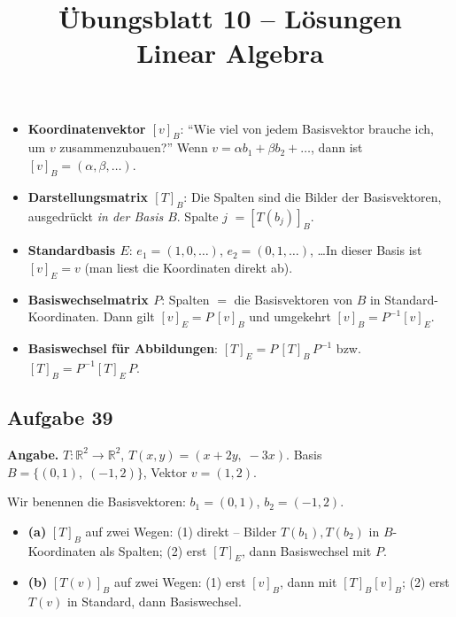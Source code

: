 \documentclass[a4paper,12pt]{article}
\title{\"Ubungsblatt 10 -- L\"osungen \\ \large Linear Algebra}
\author{}
\date{}
\begin{document}
\maketitle

\begin{begriffe}
\begin{itemize}[leftmargin=*, nosep]
    \item \textbf{Koordinatenvektor $[v]_B$}: ``Wie viel von jedem Basisvektor brauche ich, um $v$ zusammenzubauen?'' Wenn $v = \alpha b_1 + \beta b_2 + \dots$, dann ist $[v]_B = (\alpha, \beta, \dots)$.
    \item \textbf{Darstellungsmatrix $[T]_B$}: Die Spalten sind die Bilder der Basisvektoren, ausgedr\"uckt \emph{in der Basis $B$}. Spalte $j$ $= [T(b_j)]_B$.
    \item \textbf{Standardbasis $E$}: $e_1 = (1,0,\dots)$, $e_2 = (0,1,\dots)$, \dots In dieser Basis ist $[v]_E = v$ (man liest die Koordinaten direkt ab).
    \item \textbf{Basiswechselmatrix $P$}: Spalten $=$ die Basisvektoren von $B$ in Standard-Koordinaten. Dann gilt $[v]_E = P\,[v]_B$ und umgekehrt $[v]_B = P^{-1} [v]_E$.
    \item \textbf{Basiswechsel f\"ur Abbildungen}: $[T]_E = P\,[T]_B\,P^{-1}$ \quad bzw. \quad $[T]_B = P^{-1} [T]_E\, P$.
\end{itemize}
\end{begriffe}

\subsection*{Aufgabe 39}

\textbf{Angabe.} $T \colon \mathbb{R}^2 \to \mathbb{R}^2$, $T(x, y) = (x + 2y,\; -3x)$. Basis $B = \{(0,1),\; (-1,2)\}$, Vektor $v = (1, 2)$.

Wir benennen die Basisvektoren: $b_1 = (0, 1)$, $b_2 = (-1, 2)$.

\begin{wastun}
\begin{itemize}[leftmargin=*, nosep]
    \item \textbf{(a)} $[T]_B$ auf zwei Wegen: (1) direkt -- Bilder $T(b_1), T(b_2)$ in $B$-Koordinaten als Spalten; (2) erst $[T]_E$, dann Basiswechsel mit $P$.
    \item \textbf{(b)} $[T(v)]_B$ auf zwei Wegen: (1) erst $[v]_B$, dann mit $[T]_B [v]_B$; (2) erst $T(v)$ in Standard, dann Basiswechsel.
\end{itemize}
\end{wastun}
\end{document}
